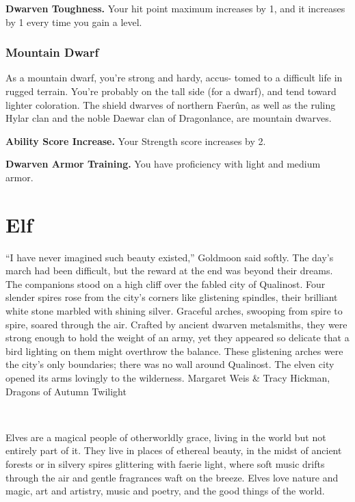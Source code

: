 \textbf{Dwarven Toughness.} Your hit point maximum increases by 1, and it increases by 1 every time you gain a level.

\subsubsection{Mountain Dwarf}
As a mountain dwarf, you’re strong and hardy, accus- tomed to a difficult life in rugged terrain. You’re probably on the tall side (for a dwarf), and tend toward lighter coloration. The shield dwarves of northern Faerûn, as well as the ruling Hylar clan and the noble Daewar clan of Dragonlance, are mountain dwarves.

\textbf{Ability Score Increase.} Your Strength score increases by 2.

\textbf{Dwarven Armor Training.} You have proficiency with light and medium armor.

\vspace*{\fill}

\section{Elf}
\DndQuote%
  {``I have never imagined such beauty existed,''}
  {Goldmoon said softly. The day’s march had been difficult, but the reward at the end was beyond their dreams. The companions stood on a high cliff over the fabled city of Qualinost. \newline\indent Four slender spires rose from the city’s corners like glistening spindles, their brilliant white stone marbled with shining silver. Graceful arches, swooping from spire to spire, soared through the air. Crafted by ancient dwarven metalsmiths, they were strong enough to hold the weight of an army, yet they appeared so delicate that a bird lighting on them might overthrow the balance. These glistening arches were the city’s only boundaries; there was no wall around Qualinost. The elven city opened its arms lovingly to the wilderness.}
  {Margaret Weis \& Tracy Hickman,\newline\hspace*{\fill} Dragons of Autumn Twilight}

\ \newline
\par\noindent Elves are a magical people of otherworldly grace, living in the world but not entirely part of it. They live in places of ethereal beauty, in the midst of ancient forests or in silvery spires glittering with faerie light, where soft music drifts through the air and gentle fragrances waft on the breeze. Elves love nature and magic, art and artistry, music and poetry, and the good things of the world.


